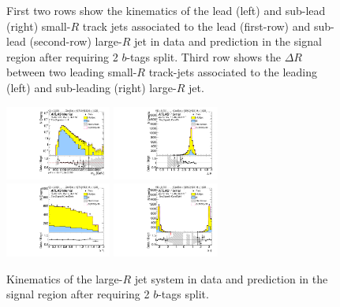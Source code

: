 \begin{figure}[htbp!]
\begin{center}
  \caption{First two rows show the kinematics of the lead (left) and sub-lead (right) small-$R$ track jets associated to the lead (first-row) and sub-lead (second-row) large-$R$ jet in data and prediction in the signal region after requiring 2 $b$-tags split. Third row shows the $\Delta R$ between two leading small-$R$ track-jets associated to the leading (left) and sub-leading (right) large-$R$ jet.  }
  \label{fig:boosted-2bs-signal-ak2}
\end{center}
\end{figure}


\begin{figure}[htbp!]
\begin{center}
\includegraphics[width=0.31\textwidth,angle=-90]{figures/boosted/Signal/b77_TwoTag_split_Signal_mHH_l_1.pdf}
\includegraphics[width=0.31\textwidth,angle=-90]{figures/boosted/Signal/b77_TwoTag_split_Signal_hCandDr.pdf}\\
\includegraphics[width=0.31\textwidth,angle=-90]{figures/boosted/Signal/b77_TwoTag_split_Signal_hCandDeta.pdf}
\includegraphics[width=0.31\textwidth,angle=-90]{figures/boosted/Signal/b77_TwoTag_split_Signal_hCandDphi.pdf}
  \caption{Kinematics of the large-$R$ jet system in data and prediction in the signal region after requiring 2 $b$-tags split.  }
  \label{fig:boosted-2bs-signal-ak10-system}
\end{center}
\end{figure}


